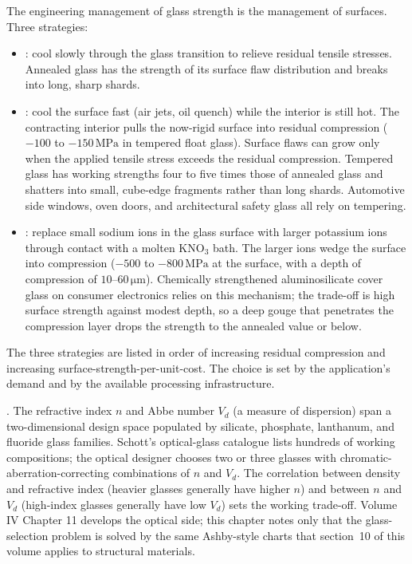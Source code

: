 The engineering management of glass strength is the management of
surfaces. Three strategies:

\begin{itemize}[leftmargin=*]
\item {}: cool slowly through the glass transition to
  relieve residual tensile stresses. Annealed glass has the strength
  of its surface flaw distribution and breaks into long, sharp shards.
\item {}: cool the surface fast (air jets, oil
  quench) while the interior is still hot. The contracting interior
  pulls the now-rigid surface into residual compression
  ($-100$ to $-150\,\text{MPa}$ in tempered float glass). Surface
  flaws can grow only when the applied tensile stress exceeds the
  residual compression. Tempered glass has working strengths four to
  five times those of annealed glass and shatters into small,
  cube-edge fragments rather than long shards. Automotive side
  windows, oven doors, and architectural safety glass all rely on
  tempering.
\item {}: replace small
  sodium ions in the glass surface with larger potassium ions through
  contact with a molten KNO$_3$ bath. The larger ions wedge the
  surface into compression ($-500$ to $-800\,\text{MPa}$ at the
  surface, with a depth of compression of $10$--$60\,\si{\micro\meter}$).
  Chemically strengthened aluminosilicate cover glass on consumer
  electronics relies on this mechanism; the trade-off is high
  surface strength against modest depth, so a deep gouge that
  penetrates the compression layer drops the strength to the
  annealed value or below.
\end{itemize}

The three strategies are listed in order of increasing residual
compression and increasing surface-strength-per-unit-cost. The choice
is set by the application's demand and by the available processing
infrastructure.

. The refractive index $n$ and Abbe number
$V_d$ (a measure of dispersion) span a two-dimensional design space
populated by silicate, phosphate, lanthanum, and fluoride glass
families. Schott's optical-glass catalogue lists hundreds of working
compositions; the optical designer chooses two or three glasses with
chromatic-aberration-correcting combinations of $n$ and $V_d$. The
correlation between density and refractive index (heavier glasses
generally have higher $n$) and between $n$ and $V_d$ (high-index glasses
generally have low $V_d$) sets the working trade-off. Volume IV
Chapter 11 develops the optical side; this chapter notes only that the
glass-selection problem is solved by the same Ashby-style charts that
section~10 of this volume applies to structural materials.

